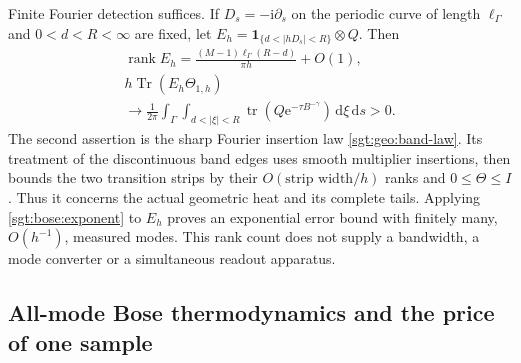 \documentclass[aps,pra,reprint,superscriptaddress,longbibliography]{revtex4-2}
\newcommand{\Tr}{\operatorname{Tr}}
\newcommand{\dd}{\mathrm d}
\newcommand{\ee}{\mathrm e}
\newcommand{\one}{\mathbf 1}
\begin{document}
Finite Fourier detection suffices.  If $D_s=-\mathrm i\partial_s$ on
the periodic curve of length $\ell_\Gamma$ and $0<d<R<\infty$ are fixed,
let $E_h=\one_{\{d<|hD_s|<R\}}\otimes Q$.  Then
\begin{gather}
 \operatorname{rank}E_h
   =\frac{(M-1)\ell_\Gamma(R-d)}{\pi h}+O(1),
 \label{sgt:bose:band-rank}\\
 h\Tr(E_h\Theta_{1,h})
\\
   \longrightarrow\frac1{2\pi}
       \int_\Gamma\int_{d<|\xi|<R}
          \operatorname{tr}(Q\ee^{-\tau B^{-\gamma}})
                       \,\dd\xi\,\dd s>0.
 \label{sgt:bose:band-signal}
\end{gather}
The second assertion is the sharp Fourier insertion law
\eqref{sgt:geo:band-law}.  Its treatment of the discontinuous band edges
uses smooth multiplier insertions, then bounds the two transition strips
by their $O(\text{strip width}/h)$ ranks and $0\le\Theta\le I$.
Thus it concerns the actual geometric heat and its complete tails.
Applying \eqref{sgt:bose:exponent} to $E_h$ proves an exponential
error bound with finitely many, $O(h^{-1})$, measured modes.  This rank
count does not supply a bandwidth, a mode converter or a simultaneous
readout apparatus.

\subsection{All-mode Bose thermodynamics and the price of one sample}
\label{sgt:bose:thermodynamics}
\end{document}
